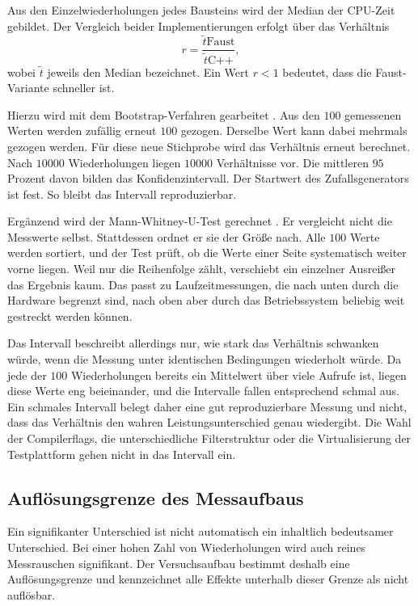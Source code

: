 Aus den Einzelwiederholungen jedes Bausteins wird der Median der CPU-Zeit
gebildet. Der Vergleich beider Implementierungen erfolgt über das Verhältnis
\begin{equation}
	r = \frac{\tilde{t}{\text{Faust}}}{\tilde{t}{\text{C++}}},
	\label{eq:verhaeltnis}
\end{equation}
wobei $\tilde{t}$ jeweils den Median bezeichnet. Ein Wert $r < 1$ bedeutet,
dass die Faust-Variante schneller ist.

Hierzu wird mit dem Bootstrap-Verfahren gearbeitet \parencite{efron1993bootstrap}. Aus den $100$ gemessenen Werten werden zufällig erneut $100$ gezogen. Derselbe Wert kann dabei mehrmals gezogen werden. Für diese neue Stichprobe wird das Verhältnis erneut berechnet. Nach $10000$ Wiederholungen liegen $10000$ Verhältnisse vor. Die mittleren $95$ Prozent davon bilden das Konfidenzintervall. Der Startwert des Zufallsgenerators ist fest. So bleibt das Intervall reproduzierbar.

Ergänzend wird der Mann-Whitney-U-Test gerechnet \parencite{mann1947test}. Er vergleicht nicht die Messwerte selbst. Stattdessen ordnet er sie der Größe nach. Alle $100$ Werte werden sortiert, und der Test prüft, ob die Werte einer Seite systematisch weiter vorne liegen. Weil nur die Reihenfolge zählt, verschiebt ein einzelner Ausreißer das Ergebnis kaum. Das passt zu Laufzeitmessungen, die nach unten durch die Hardware begrenzt sind, nach oben aber durch das Betriebssystem beliebig weit gestreckt werden können.

Das Intervall beschreibt allerdings nur, wie stark das Verhältnis schwanken
würde, wenn die Messung unter identischen Bedingungen wiederholt würde. Da
jede der $100$ Wiederholungen bereits ein Mittelwert über viele Aufrufe ist,
liegen diese Werte eng beieinander, und die Intervalle fallen entsprechend
schmal aus. Ein schmales Intervall belegt daher eine gut reproduzierbare
Messung und nicht, dass das Verhältnis den wahren Leistungsunterschied genau wiedergibt. Die Wahl der Compilerflags, die unterschiedliche Filterstruktur oder die Virtualisierung der Testplattform gehen nicht in das Intervall ein.

\subsection{Auflösungsgrenze des Messaufbaus}
\label{sec:aufloesungsgrenze}

Ein signifikanter Unterschied ist nicht automatisch ein
inhaltlich bedeutsamer Unterschied. Bei einer hohen Zahl von Wiederholungen
wird auch reines Messrauschen signifikant. Der Versuchsaufbau bestimmt deshalb eine Auflösungsgrenze und kennzeichnet alle Effekte unterhalb dieser Grenze als nicht auflösbar.

